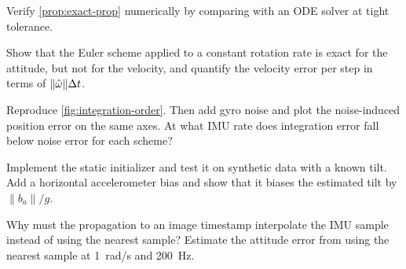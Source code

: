 \begin{exercises}
  \item Verify \cref{prop:exact-prop} numerically by comparing with an ODE solver at tight tolerance.
  \item Show that the Euler scheme applied to a constant rotation rate is exact for the attitude, but not for
        the velocity, and quantify the velocity error per step in terms of $\|\hat\omega\|{\Delta t}$.
  \item Reproduce \cref{fig:integration-order}. Then add gyro noise and plot the noise-induced position error
        on the same axes. At what IMU rate does integration error fall below noise error for each scheme?
  \item Implement the static initializer and test it on synthetic data with a known tilt. Add a horizontal
        accelerometer bias and show that it biases the estimated tilt by $\|b_a\|/g$.
  \item Why must the propagation to an image timestamp interpolate the IMU sample instead of using the
        nearest sample? Estimate the attitude error from using the nearest sample at 1~rad/s and 200~Hz.
\end{exercises}

